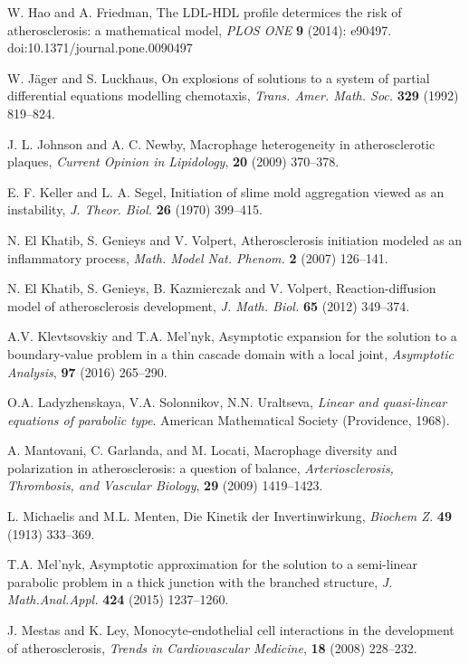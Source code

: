 \documentclass[reqno]{amsart}            %
\numberwithin{equation}{section}
\begin{document}
\begin{thebibliography}{99}
W. Hao and A. Friedman, The LDL-HDL profile determices the risk of atherosclerosis: a mathematical model, {\it PLOS ONE} {\bf 9} (2014): e90497. doi:10.1371/journal.pone.0090497

W. J\"ager and S. Luckhaus, On explosions of solutions to a system of partial differential
equations modelling chemotaxis, {\it Trans. Amer. Math. Soc.}  \textbf{329} (1992) 819--824.

J. L. Johnson and A. C. Newby, Macrophage heterogeneity in atherosclerotic plaques, {\it Current Opinion in Lipidology}, {\bf 20} (2009) 370--378.

 E. F. Keller and L. A. Segel, Initiation of slime mold aggregation viewed as an instability,
{\it J. Theor. Biol.} \textbf{26} (1970) 399--415.

N. El Khatib, S. Genieys and V. Volpert,
 Atherosclerosis initiation modeled as an inflammatory process,
{\it Math. Model Nat. Phenom.} {\bf 2} (2007) 126--141.

N. El Khatib, S. Genieys, B. Kazmierczak and V. Volpert, Reaction-diffusion model of atherosclerosis development, {\it J. Math. Biol.} {\bf 65} (2012) 349--374.

A.V. Klevtsovskiy and T.A. Mel’nyk, Asymptotic expansion for the solution to a
boundary-value problem in a thin cascade domain with a local joint, {\it Asymptotic Analysis}, {\bf 97} (2016) 265--290.

O.A. Ladyzhenskaya, V.A. Solonnikov, N.N. Uraltseva,  {\it Linear and quasi-linear equations of parabolic
type}. American Mathematical Society (Providence, 1968).

A. Mantovani, C. Garlanda, and M. Locati, Macrophage diversity and polarization in atherosclerosis: a question of
balance, {\it  Arteriosclerosis, Thrombosis, and Vascular Biology}, {\bf 29} (2009)  1419--1423.


L. Michaelis and M.L. Menten, Die Kinetik der Invertinwirkung, {\it Biochem Z.} {\bf 49}  (1913) 333--369.

T.A. Mel'nyk, Asymptotic approximation for the solution to a semi-linear parabolic problem in a thick junction with the branched structure,
{\it J. Math.Anal.Appl.} {\bf 424} (2015) 1237--1260.

J. Mestas and K. Ley, Monocyte-endothelial cell interactions in the development of atherosclerosis, {\it Trends in Cardiovascular Medicine}, {\bf 18}  (2008) 228--232.



\end{thebibliography}
\end{document}

